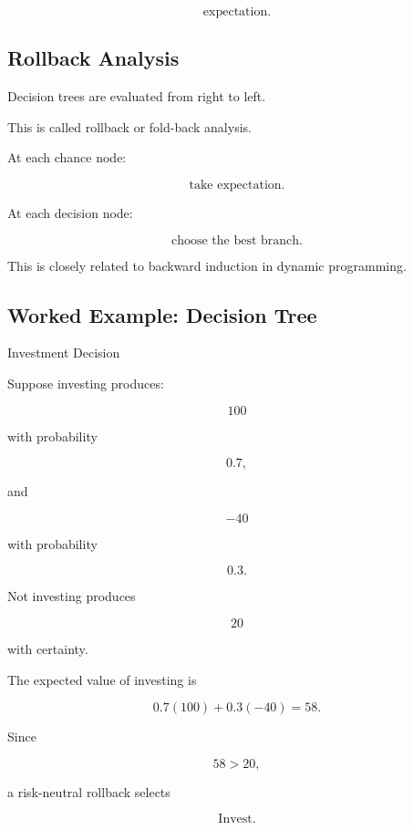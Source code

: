 \[
\boxed{
\text{expectation}.
}
\]

\subsection{Rollback Analysis}
\label{subsec:rollback-analysis}

Decision trees are evaluated from right to left.

This is called rollback or fold-back analysis.

At each chance node:

\[
\boxed{
\text{take expectation}.
}
\]

At each decision node:

\[
\boxed{
\text{choose the best branch}.
}
\]

This is closely related to backward induction in dynamic programming.

\subsection{Worked Example: Decision Tree}
\label{subsec:worked-decision-tree}

\begin{workedexamplebox}{Investment Decision}

Suppose investing produces:

\[
100
\]

with probability

\[
0.7,
\]

and

\[
-40
\]

with probability

\[
0.3.
\]

Not investing produces

\[
20
\]

with certainty.

The expected value of investing is

\[
0.7(100)
+
0.3(-40)
=
58.
\]

Since

\[
58>20,
\]

a risk-neutral rollback selects

\begin{answerbox}
\[
\boxed{
\text{Invest}.
}
\]
\end{answerbox}

\end{workedexamplebox}

